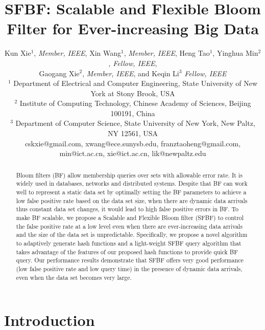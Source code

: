 \documentclass[10pt,journal,letterpaper]{IEEEtran}
\begin{document}
\title{SFBF: Scalable and Flexible Bloom Filter for Ever-increasing Big Data}
\author{Kun Xie$^1$, \emph{Member, IEEE},  Xin Wang$^1$, \emph{Member, IEEE}, Heng Tao$^1$, Yinghua Min$^2$, \emph{Fellow, IEEE}, \\ Gaogang Xie$^2$, \emph{Member, IEEE}, and Keqin Li$^3$ \emph{Fellow, IEEE} \\
$^1$ Department of Electrical and Computer Engineering, State University of New York at Stony Brook, USA\\
$^2$ Institute of Computing Technology, Chinese Academy of Sciences, Beijing 100191, China\\
$^3$ Department of Computer Science, State University of New York, New Paltz, NY 12561, USA\\
cskxie@gmail.com, xwang@ece.sunysb.edu, franztaoheng@gmail.com,  min@ict.ac.cn, xie@ict.ac.cn, lik@newpaltz.edu }
\maketitle
\vspace{-3em}
\begin{abstract}
Bloom filters (BF) allow membership queries over sets with allowable error rate. It is widely used in databases, networks and distributed systems. Despite that BF can work well to represent a static data set by optimally setting the BF parameters to achieve a low false positive rate based on the data set size, when there are dynamic data arrivals thus constant data set changes, it would lead to high false positive errors in BF. To make BF scalable, we propose a Scalable and Flexible Bloom filter (SFBF) to control the false positive rate at a low level even when there are ever-increasing data arrivals and the size of the data set is unpredictable. Specifically, we propose a novel algorithm to adaptively generate hash functions and a light-weight SFBF query algorithm that takes advantage of the features of our proposed hash functions to provide quick BF query. Our performance results demonstrate that SFBF offers very good performance (low false positive rate and low query time) in the presence of dynamic data arrivals, even when the data set becomes very large.
\end{abstract}


\section{Introduction}
\end{document}
